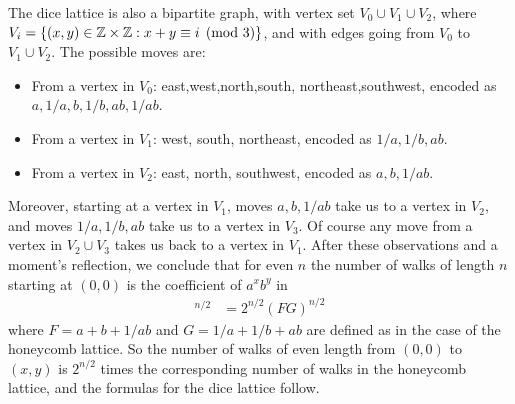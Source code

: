 \documentclass[12pt]{article}
\begin{document}
The dice lattice is also a bipartite graph, with vertex set $V_0 \cup V_1 \cup V_2$, where $V_i = \{(x,y) \in \mathbb{Z} \times \mathbb{Z}: x+y \equiv i \pmod{3} \}$, and with edges going from $V_0$ to $V_1 \cup V_2$. The possible moves are:
\begin{itemize}
\item From a vertex in $V_0$: east,west,north,south, northeast,southwest, encoded as $a, 1/a, b, 1/b, ab, 1/ab$.
\item From a vertex in $V_1$: west, south, northeast, encoded as $1/a,1/b,ab$.
\item From a vertex in $V_2$: east, north, southwest, encoded as $a, b, 1/ab$.
\end{itemize}

Moreover, starting at a vertex in $V_1$, moves $a,b,1/ab$ take us to a vertex in $V_2$, and moves $1/a,1/b,ab$ take us to a vertex in $V_3$. Of course any move from a vertex in $V_2 \cup V_3$ takes us back to a vertex in $V_1$.  After these observations and a moment's reflection, we conclude that for even $n$ the number of walks of length $n$ starting at $(0,0)$ is the coefficient of $a^xb^y$ in 
\begin{align*}
  [FG + GF]^{n/2} &= 2^{n/2}(FG)^{n/2}
\end{align*}
where $F = a+b+1/ab$ and $G=1/a + 1/b + ab$ are defined as in the case of the honeycomb lattice.  So the number of walks of even length from $(0,0)$ to $(x,y)$ is $2^{n/2}$ times the corresponding number of walks in the honeycomb lattice, and the formulas for the dice lattice follow.


\end{document}
